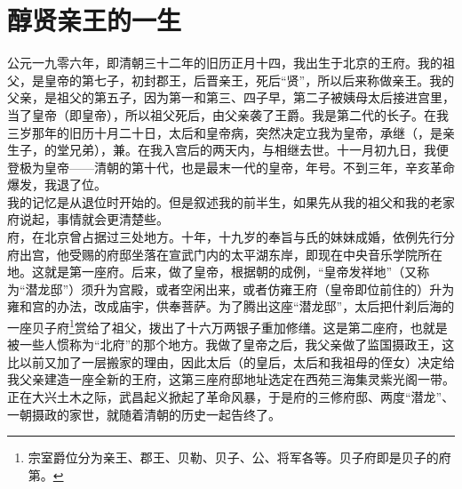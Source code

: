 \fancyhead[RO]{} %
\fancyhead[LE]{} %
\chapter*{醇贤亲王的一生}
\thispagestyle{empty}
  公元一九零六年，即清朝三十二年的旧历正月十四，我出生于北京的王府。我的祖父，是皇帝的第七子，初封郡王，后晋亲王，死后“贤”，所以后来称做亲王。我的父亲，是祖父的第五子，因为第一和第三、四子早，第二子被姨母太后接进宫里，当了皇帝（即皇帝），所以祖父死后，由父亲袭了王爵。我是第二代的长子。在我三岁那年的旧历十月二十日，太后和皇帝病，突然决定立我为皇帝，承继（，是亲生子，的堂兄弟），兼。在我入宫后的两天内，与相继去世。十一月初九日，我便登极为皇帝——清朝的第十代，也是最末一代的皇帝，年号。不到三年，辛亥革命爆发，我退了位。\\

  我的记忆是从退位时开始的。但是叙述我的前半生，如果先从我的祖父和我的老家府说起，事情就会更清楚些。\\

  府，在北京曾占据过三处地方。十年，十九岁的奉旨与氏的妹妹成婚，依例先行分府出宫，他受赐的府邸坐落在宣武门内的太平湖东岸，即现在中央音乐学院所在地。这就是第一座府。后来，做了皇帝，根据朝的成例，“皇帝发祥地”（又称为“潜龙邸”）须升为宫殿，或者空闲出来，或者仿雍王府（皇帝即位前住的）升为雍和宫的办法，改成庙宇，供奉菩萨。为了腾出这座“潜龙邸”，太后把什刹后海的一座贝子府\footnote{宗室爵位分为亲王、郡王、贝勒、贝子、公、将军各等。贝子府即是贝子的府第。}赏给了祖父，拨出了十六万两银子重加修缮。这是第二座府，也就是被一些人惯称为“北府”的那个地方。我做了皇帝之后，我父亲做了监国摄政王，这比以前又加了一层搬家的理由，因此太后（的皇后，太后和我祖母的侄女）决定给我父亲建造一座全新的王府，这第三座府邸地址选定在西苑三海集灵紫光阁一带。正在大兴土木之际，武昌起义掀起了革命风暴，于是府的三修府邸、两度“潜龙”、一朝摄政的家世，就随着清朝的历史一起告终了。\\

